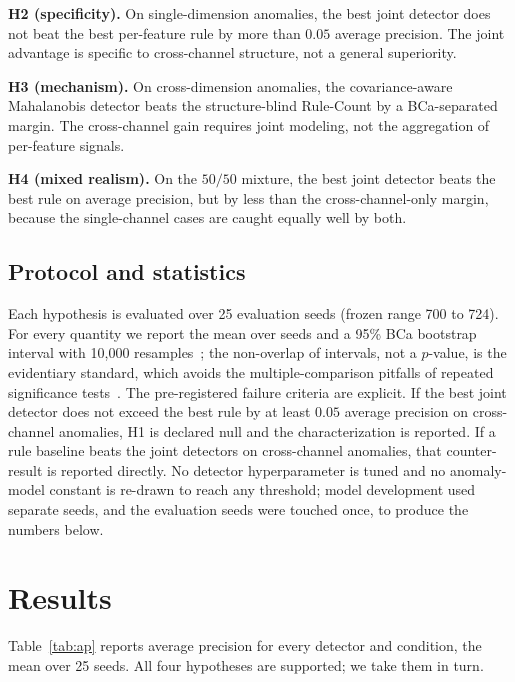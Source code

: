 \documentclass[journal]{IEEEtran}
\begin{document}
\textbf{H2 (specificity).} On single-dimension anomalies, the best joint detector does not beat the
best per-feature rule by more than $0.05$ average precision. The joint advantage is specific to
cross-channel structure, not a general superiority.

\textbf{H3 (mechanism).} On cross-dimension anomalies, the covariance-aware Mahalanobis detector
beats the structure-blind Rule-Count by a BCa-separated margin. The cross-channel gain requires
joint modeling, not the aggregation of per-feature signals.

\textbf{H4 (mixed realism).} On the $50/50$ mixture, the best joint detector beats the best rule on
average precision, but by less than the cross-channel-only margin, because the single-channel cases
are caught equally well by both.

\subsection{Protocol and statistics}
Each hypothesis is evaluated over 25 evaluation seeds (frozen range 700 to 724). For every quantity
we report the mean over seeds and a 95\% BCa bootstrap interval with 10{,}000
resamples~\cite{efron1987bca,efron1994introduction}; the non-overlap of intervals, not a $p$-value,
is the evidentiary standard, which avoids the multiple-comparison pitfalls of repeated significance
tests~\cite{wohlin2012experimentation}. The pre-registered failure criteria are explicit. If the
best joint detector does not exceed the best rule by at least $0.05$ average precision on
cross-channel anomalies, H1 is declared null and the characterization is reported. If a rule
baseline beats the joint detectors on cross-channel anomalies, that counter-result is reported
directly. No detector hyperparameter is tuned and no anomaly-model constant is re-drawn to reach any
threshold; model development used separate seeds, and the evaluation seeds were touched once, to
produce the numbers below.

\section{Results}
Table~\ref{tab:ap} reports average precision for every detector and condition, the mean over 25
seeds. All four hypotheses are supported; we take them in turn.
\end{document}
